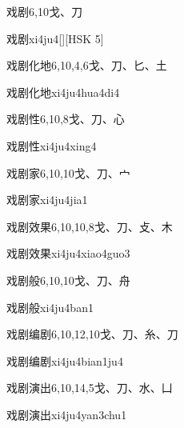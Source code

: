 \begin{Entry}{戏剧}{6,10}{⼽、⼑}
  \begin{Phonetics}{戏剧}{xi4ju4}[][HSK 5]
  \end{Phonetics}
\end{Entry}

\begin{Entry}{戏剧化地}{6,10,4,6}{⼽、⼑、⼔、⼟}
  \begin{Phonetics}{戏剧化地}{xi4ju4hua4di4}
  \end{Phonetics}
\end{Entry}

\begin{Entry}{戏剧性}{6,10,8}{⼽、⼑、⼼}
  \begin{Phonetics}{戏剧性}{xi4ju4xing4}
  \end{Phonetics}
\end{Entry}

\begin{Entry}{戏剧家}{6,10,10}{⼽、⼑、⼧}
  \begin{Phonetics}{戏剧家}{xi4ju4jia1}
  \end{Phonetics}
\end{Entry}

\begin{Entry}{戏剧效果}{6,10,10,8}{⼽、⼑、⽁、⽊}
  \begin{Phonetics}{戏剧效果}{xi4ju4xiao4guo3}
  \end{Phonetics}
\end{Entry}

\begin{Entry}{戏剧般}{6,10,10}{⼽、⼑、⾈}
  \begin{Phonetics}{戏剧般}{xi4ju4ban1}
  \end{Phonetics}
\end{Entry}

\begin{Entry}{戏剧编剧}{6,10,12,10}{⼽、⼑、⽷、⼑}
  \begin{Phonetics}{戏剧编剧}{xi4ju4bian1ju4}
  \end{Phonetics}
\end{Entry}

\begin{Entry}{戏剧演出}{6,10,14,5}{⼽、⼑、⽔、⼐}
  \begin{Phonetics}{戏剧演出}{xi4ju4yan3chu1}
  \end{Phonetics}
\end{Entry}

